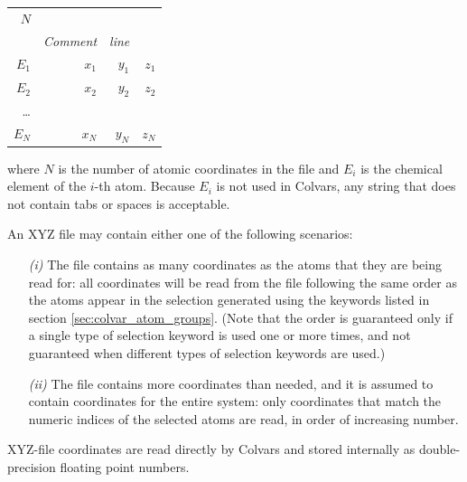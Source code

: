 \noindent\begin{tabular}{r r r r}
$N$\\
& \emph{Comment} & \emph{line} & \\
$E_{1}$ & $x_{1}$ & $y_{1}$ & $z_{1}$\\
$E_{2} $ & $x_{2}$ & $y_{2}$ & $z_{2}$\\
\ldots\\
$E_{N}$ & $x_{N}$ & $y_{N}$ & $z_{N}$ \\
\end{tabular}

\noindent{}where $N$ is the number of atomic coordinates in the file and $E_i$ is the chemical element of the $i$-th atom.
Because $E_i$ is not used in Colvars, any string that does not contain tabs or spaces is acceptable.

An XYZ file may contain either one of the following scenarios:
\begin{enumerate}
\item[\emph{(i)}] The file contains as many coordinates as the atoms that they are being read for: all coordinates will be read from the file following the same order as the atoms appear in the selection generated using the keywords listed in section \ref{sec:colvar_atom_groups}.
  (Note that the order is guaranteed only if a single type of selection keyword is used one or more times, and not guaranteed when different types of selection keywords are used.)
\item[\emph{(ii)}] The file contains more coordinates than needed, and it is assumed to contain coordinates for the entire system: only coordinates that match the numeric indices of the selected atoms are read, in order of increasing number.
\end{enumerate}

XYZ-file coordinates are read directly by Colvars and stored internally as double-precision floating point numbers.


